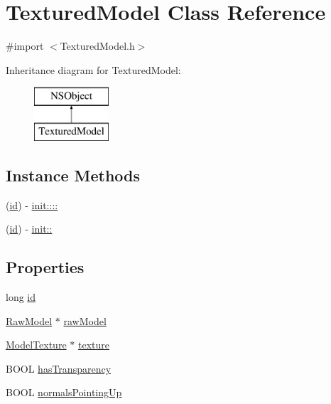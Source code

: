 \hypertarget{interface_textured_model}{}\section{Textured\+Model Class Reference}
\label{interface_textured_model}


{\ttfamily \#import $<$Textured\+Model.\+h$>$}

Inheritance diagram for Textured\+Model\+:\begin{figure}[H]
\begin{center}
\leavevmode
\includegraphics[height=2.000000cm]{interface_textured_model}
\end{center}
\end{figure}
\subsection*{Instance Methods}
\begin{DoxyCompactItemize}
\item 
(\hyperlink{interface_textured_model_aca9eab5290f81898de99b46078419ebc}{id}) -\/ \hyperlink{interface_textured_model_a0beb4248998bf716095b537fce368336}{init\+::::}
\item 
(\hyperlink{interface_textured_model_aca9eab5290f81898de99b46078419ebc}{id}) -\/ \hyperlink{interface_textured_model_aeef3037569cd0cd46a06023070fa4854}{init\+::}
\end{DoxyCompactItemize}
\subsection*{Properties}
\begin{DoxyCompactItemize}
\item 
long \hyperlink{interface_textured_model_aca9eab5290f81898de99b46078419ebc}{id}
\item 
\hyperlink{interface_raw_model}{Raw\+Model} $\ast$ \hyperlink{interface_textured_model_a502115a1985353177ee79ee41bf5f88f}{raw\+Model}
\item 
\hyperlink{interface_model_texture}{Model\+Texture} $\ast$ \hyperlink{interface_textured_model_a4044c19645d8a4dbb6bb1e7c0fe8d5e9}{texture}
\item 
B\+O\+OL \hyperlink{interface_textured_model_a025325456b8589e41a1d514a5424f0fa}{has\+Transparency}
\item 
B\+O\+OL \hyperlink{interface_textured_model_a04689af3a31961d1f4fcf058e264c3c8}{normals\+Pointing\+Up}
\end{DoxyCompactItemize}


